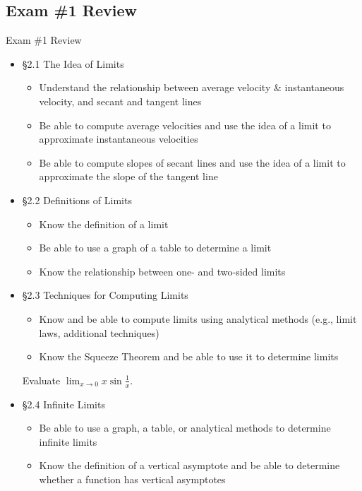 \documentclass[cal1spr16Lectures.tex]{subfiles}
\begin{document}
\subsection{Exam \#1 Review}

\begin{frame}[allowframebreaks]{Exam \#1 Review}\footnotesize
\begin{itemize}
\item \S 2.1  The Idea of Limits
	\begin{itemize}\footnotesize
	\item Understand the relationship between average velocity \& instantaneous velocity, and secant and tangent lines
	\item Be able to compute average velocities and use the idea of a limit to approximate instantaneous velocities
	\item Be able to compute slopes of secant lines and use the idea of a limit to approximate the slope of the tangent line
	\end{itemize}
\item \S 2.2 Definitions of Limits
	\begin{itemize}\footnotesize
	\item Know the definition of a limit
	\item Be able to use a graph of a table to determine a limit
	\item Know the relationship between one- and two-sided limits
	\end{itemize}
\framebreak	
\item \S 2.3 Techniques for Computing Limits
	\begin{itemize}\footnotesize
	\item Know and be able to compute limits using analytical methods (e.g., limit laws, additional techniques)
	\item Know the Squeeze Theorem and be able to use it to determine limits
	\end{itemize}
\begin{ex} Evaluate $\displaystyle\lim_{x\to 0}x\sin{\frac{1}{x}}$. \end{ex}	
\framebreak
\item \S 2.4 Infinite Limits
	\begin{itemize}\footnotesize
	\item Be able to use a graph, a table, or analytical methods to determine infinite limits
	\item Know the definition of a vertical asymptote  and be able to determine whether a function has vertical asymptotes 

\end{itemize}
\end{itemize}
\end{frame}
\end{document}
